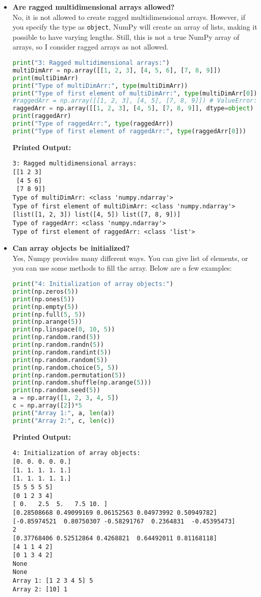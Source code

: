 \documentclass{article}
\begin{document}
\begin{itemize}
\item \textbf{Are ragged multidimensional arrays allowed?} \\
No, it is not allowed to create ragged multidimensional arrays. However, if you specify the type as \texttt{object}, NumPy will create an array of lists, making it possible to have varying lengths. Still, this is not a true NumPy array of arrays, so I consider ragged arrays as not allowed.
\begin{lstlisting}[language=Python]
print("3: Ragged multidimensional arrays:")
multiDimArr = np.array([[1, 2, 3], [4, 5, 6], [7, 8, 9]])
print(multiDimArr)
print("Type of multiDimArr:", type(multiDimArr))
print("Type of first element of multiDimArr:", type(multiDimArr[0]))
#raggedArr = np.array([[1, 2, 3], [4, 5], [7, 8, 9]]) # ValueError: The requested array has an inhomogeneous shape.
raggedArr = np.array([[1, 2, 3], [4, 5], [7, 8, 9]], dtype=object)
print(raggedArr)
print("Type of raggedArr:", type(raggedArr))
print("Type of first element of raggedArr:", type(raggedArr[0]))
\end{lstlisting}
\textbf{Printed Output:}
\begin{verbatim}
3: Ragged multidimensional arrays:
[[1 2 3]
 [4 5 6]
 [7 8 9]]
Type of multiDimArr: <class 'numpy.ndarray'>
Type of first element of multiDimArr: <class 'numpy.ndarray'>
[list([1, 2, 3]) list([4, 5]) list([7, 8, 9])]
Type of raggedArr: <class 'numpy.ndarray'>
Type of first element of raggedArr: <class 'list'>
\end{verbatim}



\item \textbf{Can array objects be initialized?} \\
Yes, Numpy provides many different ways. You can give list of elements, or you can use some methods to fill the array. Below are a few examples:
\begin{lstlisting}[language=Python]
print("4: Initialization of array objects:")
print(np.zeros(5))
print(np.ones(5))
print(np.empty(5))
print(np.full(5, 5))
print(np.arange(5))
print(np.linspace(0, 10, 5))
print(np.random.rand(5))
print(np.random.randn(5))
print(np.random.randint(5))
print(np.random.random(5))
print(np.random.choice(5, 5))
print(np.random.permutation(5))
print(np.random.shuffle(np.arange(5)))
print(np.random.seed(5))
a = np.array([1, 2, 3, 4, 5])
c = np.array([2])*5
print("Array 1:", a, len(a))
print("Array 2:", c, len(c))
\end{lstlisting}
\textbf{Printed Output:}
\begin{verbatim}
4: Initialization of array objects:
[0. 0. 0. 0. 0.]
[1. 1. 1. 1. 1.]
[1. 1. 1. 1. 1.]
[5 5 5 5 5]
[0 1 2 3 4]
[ 0.   2.5  5.   7.5 10. ]
[0.28508668 0.49099169 0.06152563 0.04973992 0.50949782]
[-0.85974521  0.80750307 -0.58291767  0.2364831  -0.45395473]
2
[0.37768406 0.52512864 0.4268821  0.64492011 0.81168118]
[4 1 1 4 2]
[0 1 3 4 2]
None
None
Array 1: [1 2 3 4 5] 5
Array 2: [10] 1
\end{verbatim}


\end{itemize}
\end{document}
